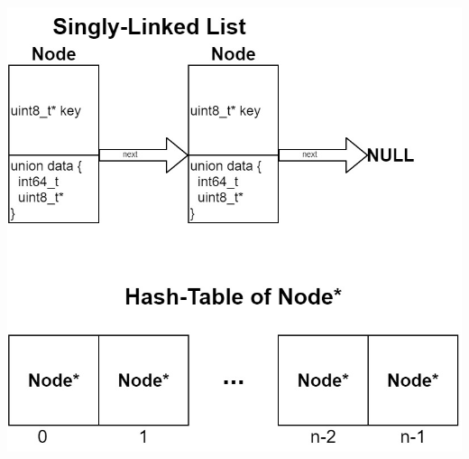 \documentclass[11pt,letterpaper]{article}
\begin{document}
\begin{center}
\includegraphics[scale=.4]{resources/node.jpg}
\end{center}
\pagebreak
\end{document}
